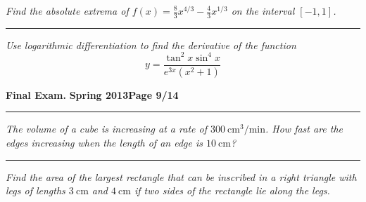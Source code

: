 \documentclass[12pt]{article}
\begin{document}
\bigskip
{\problem[10 pts] \em Find the absolute extrema of $f(x) = \frac{8}{3} x^{4/3} - \frac{4}{3} x^{1/3}$ on the interval $[-1,1]$.}
\vspace{6cm}
\begin{flushright}
\end{flushright}
\hrule
{\problem[10 pts] \em Use logarithmic differentiation to find the
  derivative of the function 
\begin{equation*}
y=\frac{\tan^2 x \sin^4 x}{e^{3x}(x^2+1)}
\end{equation*}
\vspace{7cm}
\begin{flushright}
\end{flushright}
\newpage

\hfill{\large\bf Final Exam.}\hfill{\large\bf
  Spring 2013}\hfill{\large\bf Page 9/14}\hrule

\bigskip
{\problem[10 pts] \em The volume of a cube is increasing at a rate of
  $300~\text{cm}^3/\text{min}$.  How fast are the edges increasing
  when the length of an edge is $10~\text{cm}$?}
\vspace{6cm}
\begin{flushright}
\end{flushright}
\hrule
{\problem[20 pts] \em Find the area of the largest rectangle that can
  be inscribed in a right triangle with legs of lengths $3~\text{cm}$
  and $4~\text{cm}$ if two sides of the rectangle lie along the legs.}
\vspace{11cm}
\begin{flushright}
\end{flushright}

}
\end{document}
